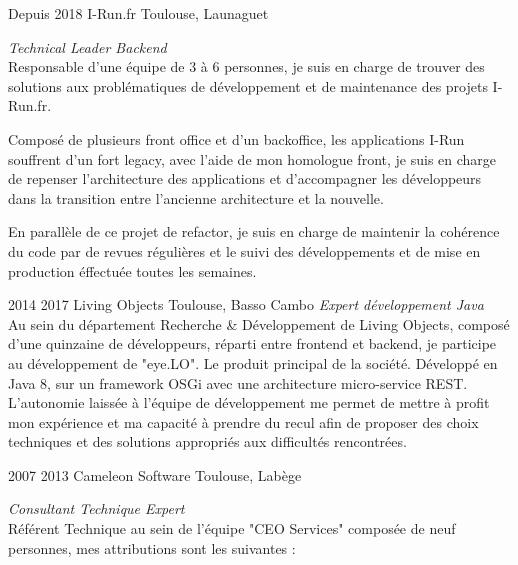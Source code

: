 \documentclass{friggeri-cv} 	%
\begin{document}
\begin{entrylist}
\entry
{Depuis 2018}
{I-Run.fr}
{Toulouse, Launaguet}
{\vspace{0.2cm}\emph{Technical Leader Backend} \\
Responsable d’une équipe de 3 à 6 personnes, je suis en charge de trouver des solutions aux problématiques de développement 
et de maintenance des projets I-Run.fr.

Composé de plusieurs front office et d’un backoffice, les applications I-Run souffrent d’un fort legacy, avec l’aide de mon homologue
front, je suis en charge de repenser l’architecture des applications et d’accompagner les développeurs dans la transition entre
l’ancienne architecture et la nouvelle.

En parallèle de ce projet de refactor, je suis en charge de maintenir la cohérence du code par de revues régulières et le suivi des 
développements et de mise en production éffectuée toutes les semaines.
\\}

\entry
{2014  2017}
{Living Objects}
{Toulouse, Basso Cambo}
{\vspace{0.2cm}\emph{Expert développement Java} \\
Au sein du département Recherche \& Développement de Living Objects, composé d’une quinzaine de développeurs,
réparti entre frontend et backend, je participe au développement de "eye.LO". Le produit principal de la société. Développé
en Java 8, sur un framework OSGi avec une architecture micro-service REST.\\

L’autonomie laissée à l’équipe de développement me permet de mettre à profit mon expérience et ma capacité à prendre du recul afin de proposer des choix techniques et des solutions appropriés aux difficultés rencontrées.
\\}

\entry
{2007  2013}
{Cameleon Software}
{Toulouse, Labège}
{\vspace{0.2cm}\emph{Consultant Technique Expert} \\
Référent Technique au sein de l’équipe "CEO Services" composée de neuf personnes, mes attributions sont les suivantes :

}
\end{entrylist}
\end{document}
